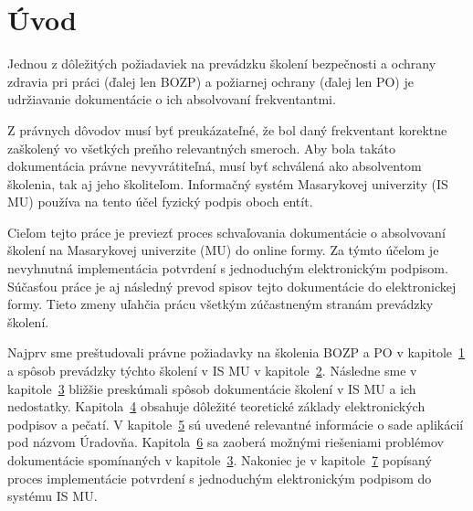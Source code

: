 \documentclass[
  digital,     %
  oneside,     %
  nosansbold,  %
  nocolorbold, %
  lof,         %
  nolot,         %
]{fithesis4}
\begin{document}
\chapter*{Úvod}
\label{chap:intro}
Jednou z dôležitých požiadaviek na prevádzku školení bezpečnosti a ochrany zdravia pri práci (ďalej len BOZP) a požiarnej ochrany (ďalej len PO) je udržiavanie dokumentácie o ich absolvovaní frekventantmi.

Z právnych dôvodov musí byť preukázateľné, že bol daný frekventant korektne zaškolený vo všetkých preňho relevantných smeroch. Aby bola takáto dokumentácia právne nevyvrátiteľná, musí byť schválená ako absolventom školenia, tak aj jeho školiteľom. Informačný systém Masarykovej univerzity (IS MU) používa na tento účel fyzický podpis oboch entít.

Cieľom tejto práce je previezť proces schvaľovania dokumentácie o absolvovaní školení na Masarykovej univerzite (MU) do online formy. Za týmto účelom je nevyhnutná implementácia potvrdení s jednoduchým elektronickým podpisom. Súčasťou práce je aj následný prevod spisov tejto dokumentácie do elektronickej formy. Tieto zmeny uľahčia prácu všetkým zúčastneným stranám prevádzky školení.

Najprv sme preštudovali právne požiadavky na školenia BOZP a PO v kapitole~\hyperref[kap-1]{1} a spôsob prevádzky týchto školení v IS MU v kapitole~\hyperref[kap-2]{2}. Následne sme v kapitole~\hyperref[kap-3]{3} bližšie preskúmali spôsob dokumentácie školení v IS MU a ich nedostatky. Kapitola~\hyperref[kap-4]{4} obsahuje dôležité teoretické základy elektronických podpisov a pečatí. V kapitole~\hyperref[kap-5]{5} sú uvedené relevantné informácie o sade aplikácií pod názvom Úradovňa. Kapitola~\hyperref[kap-6]{6} sa zaoberá možnými riešeniami problémov dokumentácie spomínaných v kapitole~\hyperref[kap-3]{3}. Nakoniec je v kapitole~\hyperref[kap-7]{7} popísaný proces implementácie potvrdení s jednoduchým elektronickým podpisom do systému IS MU.
\end{document}
